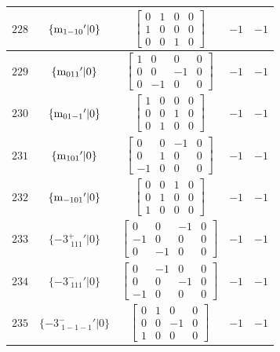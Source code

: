 \documentclass[fleqn,8pt]{jsarticle}
\begin{document}
\begin{longtable}{ccccc}
$ 228 $ & $ \{{\rm m}_{1-10}{}'|0\} $ & $ \begin{bmatrix} 0 & 1 & 0 & 0 \\ 1 & 0 & 0 & 0 \\ 0 & 0 & 1 & 0 \end{bmatrix} $ & $ -1 $ & $ -1 $ \\ \hline
$ 229 $ & $ \{{\rm m}_{011}{}'|0\} $ & $ \begin{bmatrix} 1 & 0 & 0 & 0 \\ 0 & 0 & -1 & 0 \\ 0 & -1 & 0 & 0 \end{bmatrix} $ & $ -1 $ & $ -1 $ \\ \hline
$ 230 $ & $ \{{\rm m}_{01-1}{}'|0\} $ & $ \begin{bmatrix} 1 & 0 & 0 & 0 \\ 0 & 0 & 1 & 0 \\ 0 & 1 & 0 & 0 \end{bmatrix} $ & $ -1 $ & $ -1 $ \\ \hline
$ 231 $ & $ \{{\rm m}_{101}{}'|0\} $ & $ \begin{bmatrix} 0 & 0 & -1 & 0 \\ 0 & 1 & 0 & 0 \\ -1 & 0 & 0 & 0 \end{bmatrix} $ & $ -1 $ & $ -1 $ \\ \hline
$ 232 $ & $ \{{\rm m}_{-101}{}'|0\} $ & $ \begin{bmatrix} 0 & 0 & 1 & 0 \\ 0 & 1 & 0 & 0 \\ 1 & 0 & 0 & 0 \end{bmatrix} $ & $ -1 $ & $ -1 $ \\ \hline
$ 233 $ & $ \{-3^{+}_{\,\,111}{}'|0\} $ & $ \begin{bmatrix} 0 & 0 & -1 & 0 \\ -1 & 0 & 0 & 0 \\ 0 & -1 & 0 & 0 \end{bmatrix} $ & $ -1 $ & $ -1 $ \\ \hline
$ 234 $ & $ \{-3^{-}_{\,\,111}{}'|0\} $ & $ \begin{bmatrix} 0 & -1 & 0 & 0 \\ 0 & 0 & -1 & 0 \\ -1 & 0 & 0 & 0 \end{bmatrix} $ & $ -1 $ & $ -1 $ \\ \hline
$ 235 $ & $ \{-3^{-}_{\,\,1-1-1}{}'|0\} $ & $ \begin{bmatrix} 0 & 1 & 0 & 0 \\ 0 & 0 & -1 & 0 \\ 1 & 0 & 0 & 0 \end{bmatrix} $ & $ -1 $ & $ -1 $ \\ \hline

\end{longtable}
\end{document}
